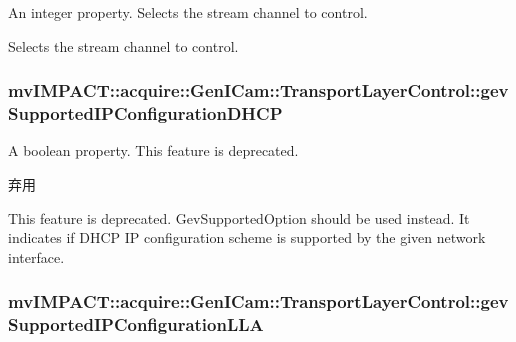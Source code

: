 An integer property. Selects the stream channel to control. 

Selects the stream channel to control. \hypertarget{classmv_i_m_p_a_c_t_1_1acquire_1_1_gen_i_cam_1_1_transport_layer_control_a600a9dd1838db2516178dc639475100c}{
\subsubsection[{gev\+Supported\+I\+P\+Configuration\+D\+H\+C\+P}]{ mv\+I\+M\+P\+A\+C\+T\+::acquire\+::\+Gen\+I\+Cam\+::\+Transport\+Layer\+Control\+::gev\+Supported\+I\+P\+Configuration\+D\+H\+C\+P}}\label{classmv_i_m_p_a_c_t_1_1acquire_1_1_gen_i_cam_1_1_transport_layer_control_a600a9dd1838db2516178dc639475100c}


A boolean property. This feature is deprecated. 

\begin{DoxyRefDesc}{弃用}
\item[\hyperlink{deprecated__deprecated000064}{弃用}]This feature is deprecated. Gev\+Supported\+Option should be used instead. It indicates if D\+H\+C\+P I\+P configuration scheme is supported by the given network interface. \end{DoxyRefDesc}
\hypertarget{classmv_i_m_p_a_c_t_1_1acquire_1_1_gen_i_cam_1_1_transport_layer_control_af7c04818203a537b79bf3e4cdcc6b7ce}{
\subsubsection[{gev\+Supported\+I\+P\+Configuration\+L\+L\+A}]{ mv\+I\+M\+P\+A\+C\+T\+::acquire\+::\+Gen\+I\+Cam\+::\+Transport\+Layer\+Control\+::gev\+Supported\+I\+P\+Configuration\+L\+L\+A}}\label{classmv_i_m_p_a_c_t_1_1acquire_1_1_gen_i_cam_1_1_transport_layer_control_af7c04818203a537b79bf3e4cdcc6b7ce}


